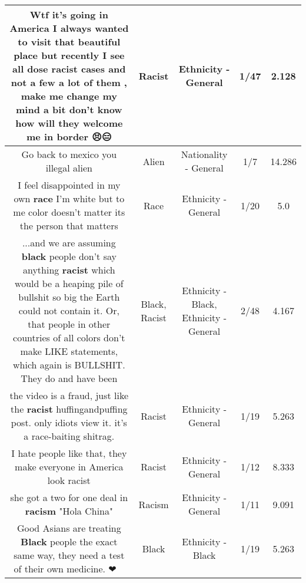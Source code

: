 \documentclass[11pt]{article}
\newlength\mylength
\begin{document}
\begin{center}
\begin{longtable}{|C{.65\mylength}|C{.30\mylength}|C{.12\mylength}|C{.12\mylength}|C{.12\mylength}|}
  \small Wtf it's going in America I always wanted to visit that beautiful place but recently I see all dose \textbf{racist} cases and not a few a lot of them , make me change my mind a bit don't know how will they welcome me in border 😣😑\normalsize   & Racist & Ethnicity - General & 1/47 & 2.128 \\  \hline
  \small Go back to mexico you illegal alien\normalsize   & Alien & Nationality - General & 1/7 & 14.286 \\  \hline
  \small I feel disappointed in my own \textbf{race}  I'm white but to me color doesn't matter its the person that matters\normalsize   & Race & Ethnicity - General & 1/20 & 5.0 \\  \hline
  \small ...and we are assuming \textbf{black} people don't say anything \textbf{racist} which would be a heaping pile of bullshit so big the Earth could not contain it.  Or, that people in other countries of all colors don't make LIKE statements, which again is BULLSHIT.    They do and have been\normalsize   & Black, Racist & Ethnicity - Black, Ethnicity - General & 2/48 & 4.167 \\  \hline
  \small the video is a fraud, just like the \textbf{racist} huffingandpuffing post.  only idiots view it. it's a race-baiting shitrag.\normalsize   & Racist & Ethnicity - General & 1/19 & 5.263 \\  \hline
  \small I hate people like that, they make everyone in America look racist\normalsize   & Racist & Ethnicity - General & 1/12 & 8.333 \\  \hline
  \small she got a two for one deal in \textbf{racism} "Hola China"\normalsize   & Racism & Ethnicity - General & 1/11 & 9.091 \\  \hline
  \small Good Asians are treating \textbf{Black} people the exact same way, they need a test of their own medicine. ❤🖤💚💛\normalsize   & Black & Ethnicity - Black & 1/19 & 5.263 \\  \hline

\end{longtable}
\end{center}
\end{document}
